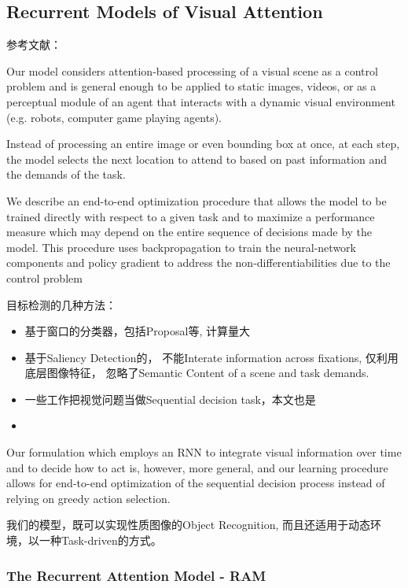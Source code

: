 \subsection{Recurrent Models of Visual Attention}

参考文献：\cite{Attention2014}

Our model considers attention-based processing of a visual scene as a control problem and is general enough to be applied to static images, videos,
or as a perceptual module of an agent that interacts with a dynamic visual environment (e.g. robots,
computer game playing agents).

Instead of processing an entire image or even bounding box at once, at each step, the model
selects the next location to attend to based on past information and the demands of the task.

We describe an end-to-end
optimization procedure that allows the model to be trained directly with respect to a given task and
to maximize a performance measure which may depend on the entire sequence of decisions made by
the model. This procedure uses backpropagation to train the neural-network components and policy
gradient to address the non-differentiabilities due to the control problem

目标检测的几种方法：
\begin{itemize}
\item 基于窗口的分类器，包括Proposal等, 计算量大
\item 基于Saliency Detection的， 不能Interate information across fixations, 仅利用底层图像特征， 忽略了Semantic Content of a scene and task demands.
\item 一些工作把视觉问题当做Sequential decision task，本文也是
\item 
\end{itemize}

Our formulation which employs an RNN to integrate visual
information over time and to decide how to act is, however, more general, and our learning procedure
allows for end-to-end optimization of the sequential decision process instead of relying on greedy
action selection.

我们的模型，既可以实现性质图像的Object Recognition, 而且还适用于动态环境，以一种Task-driven的方式。

\subsubsection{The Recurrent Attention Model - RAM }

